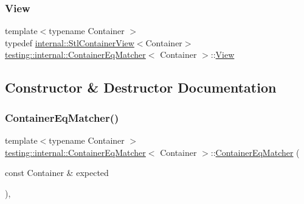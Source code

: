 \mbox{\label{classtesting_1_1internal_1_1_container_eq_matcher_a1565779cdc3d617fcdc8293f9b53c2a6}} 
\subsubsection{\texorpdfstring{View}{View}}
{\footnotesize\ttfamily template$<$typename Container $>$ \\
typedef \hyperlink{classtesting_1_1internal_1_1_stl_container_view}{internal\+::\+Stl\+Container\+View}$<$Container$>$ \hyperlink{classtesting_1_1internal_1_1_container_eq_matcher}{testing\+::internal\+::\+Container\+Eq\+Matcher}$<$ Container $>$\+::\hyperlink{classtesting_1_1internal_1_1_container_eq_matcher_a1565779cdc3d617fcdc8293f9b53c2a6}{View}}



\subsection{Constructor \& Destructor Documentation}
\mbox{\label{classtesting_1_1internal_1_1_container_eq_matcher_ad9a4c224c92176d57a865191f419802f}} 
\subsubsection{\texorpdfstring{Container\+Eq\+Matcher()}{ContainerEqMatcher()}}
{\footnotesize\ttfamily template$<$typename Container $>$ \\
\hyperlink{classtesting_1_1internal_1_1_container_eq_matcher}{testing\+::internal\+::\+Container\+Eq\+Matcher}$<$ Container $>$\+::\hyperlink{classtesting_1_1internal_1_1_container_eq_matcher}{Container\+Eq\+Matcher} (\begin{DoxyParamCaption}\item[{const Container \&}]{expected }\end{DoxyParamCaption})\hspace{0.3cm}{\ttfamily [inline]}, {\ttfamily [explicit]}}



